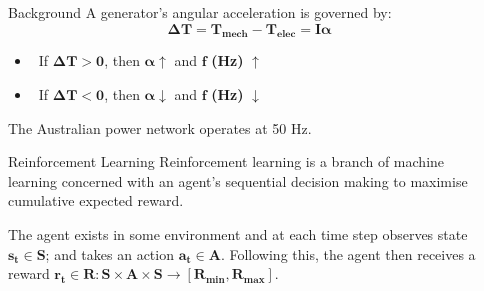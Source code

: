 \documentclass[final]{beamer}
\newlength{\sepwid}
\newlength{\onecolwid}
\begin{document}
\begin{frame}[t] %

\begin{columns}[t] %

\begin{column}{\sepwid}\end{column} %

\begin{column}{\onecolwid} %


\begin{block}{Background}
A generator's angular acceleration is governed by:
\begin{equation*}
	\boldsymbol{\Delta T = T_{mech} - T_{elec} = I \alpha}
\end{equation*}
\vspace{-2cm}
\begin{itemize}
	\setlength{\itemindent}{1em}
	\item \ If $\boldsymbol{\Delta T > 0}$, then $\boldsymbol{\alpha \uparrow}$ and $\boldsymbol{f}$ \textbf{(Hz)} $\uparrow$
	\item \ If $\boldsymbol{\Delta T < 0}$, then $\boldsymbol{\alpha \downarrow}$ and $\boldsymbol{f}$ \textbf{(Hz)} $\downarrow$
\end{itemize}
The Australian power network operates at 50 Hz.
\end{block}



\begin{block}{Reinforcement Learning}
Reinforcement learning is a branch of machine learning concerned with an agent's sequential decision making to maximise cumulative expected reward.
	\begin{figure}
		
	\end{figure}
The agent exists in some environment and at each time step observes state $\boldsymbol{s_t \in S}$; and takes an action $\boldsymbol{a_t \in A}$. Following this, the agent then receives a reward $\boldsymbol{r_t \in R: S \times A \times S \to [R_{min}, R_{max}]}$.
\end{block}



\end{column}
\end{columns}
\end{frame}
\end{document}
